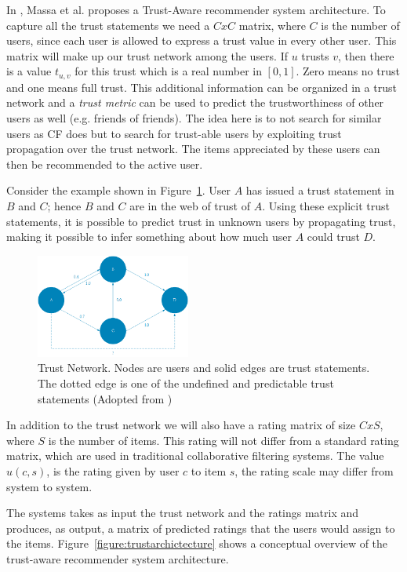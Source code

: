 In \cite{Massa2004}, Massa et al. proposes a Trust-Aware recommender system
architecture.  To capture all the trust statements we need a $CxC$ matrix,
where $C$ is the number of users, since each user is allowed to express a trust
value in every other user. This matrix will make up our trust network among the
users. If $u$ trusts $v$, then there is a value $t_{u,v}$ for this trust which
is a real number in $[0,1]$. Zero means no trust and one means full trust. This
additional information can be organized in a trust network and a \emph{trust
metric} can be used to predict the trustworthiness of other users as well
(e.g. friends of friends). The idea here is to not search for similar users
as CF does but to search for trust-able users by exploiting trust propagation
over the trust network. The items appreciated by these users can then be
recommended to the active user.

Consider the example shown in Figure~\ref{figure:weboftrust}. User $A$ has
issued a trust statement in $B$ and $C$; hence $B$ and $C$ are in the web of
trust of $A$. Using these explicit trust statements, it is possible to predict
trust in unknown users by propagating trust, making it possible to infer
something about how much user $A$ could trust $D$.

\begin{figure}[H]
    \includegraphics[width=2in]{image/webofTrust.png}
    \centering
    \caption[Trust Network]{Trust Network. Nodes are users and solid edges are trust statements. The dotted edge is one of the undefined and predictable trust statements (Adopted from \cite{Massa2004})}
    \label{figure:weboftrust}
\end{figure}

In addition to the trust network we will also have a rating matrix of size
$CxS$, where $S$ is the number of items. This rating will not differ from a
standard rating matrix, which are used in traditional collaborative filtering
systems. The value $u(c,s)$, is the rating given by user $c$ to item $s$, the
rating scale may differ from system to system.

The systems takes as input the trust network and the ratings matrix and
produces, as output, a matrix of predicted ratings that the users would assign
to the items. Figure~\ref{figure:trustarchictecture} shows a conceptual
overview of the trust-aware recommender system architecture.

